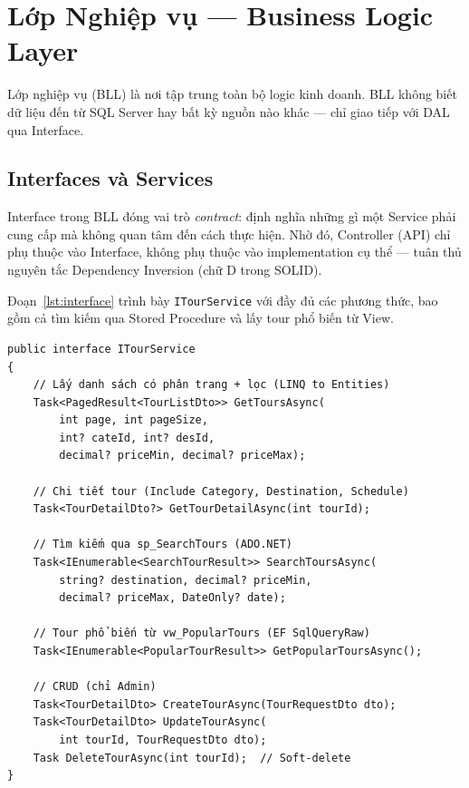 \section{Lớp Nghiệp vụ — Business Logic Layer}\label{Sec3.3}

Lớp nghiệp vụ (BLL) là nơi tập trung toàn bộ logic kinh doanh.
BLL không biết dữ liệu đến từ SQL Server hay bất kỳ nguồn nào
khác — chỉ giao tiếp với DAL qua Interface.

\subsection{Interfaces và Services}\label{sub3.3.1}

\begin{de}\label{def3.4}
Interface trong BLL đóng vai trò \textit{contract}: định nghĩa
những gì một Service phải cung cấp mà không quan tâm đến cách
thực hiện. Nhờ đó, Controller (API) chỉ phụ thuộc vào Interface,
không phụ thuộc vào implementation cụ thể — tuân thủ nguyên tắc
Dependency Inversion (chữ D trong SOLID).
\end{de}

Đoạn~\ref{lst:interface} trình bày \texttt{ITourService} với
đầy đủ các phương thức, bao gồm cả tìm kiếm qua Stored
Procedure và lấy tour phổ biến từ View.

\begin{lstlisting}[style=csharp,
  caption={ITourService -- Interface của BLL},
  label={lst:interface}]
public interface ITourService
{
    // Lấy danh sách có phân trang + lọc (LINQ to Entities)
    Task<PagedResult<TourListDto>> GetToursAsync(
        int page, int pageSize,
        int? cateId, int? desId,
        decimal? priceMin, decimal? priceMax);

    // Chi tiết tour (Include Category, Destination, Schedule)
    Task<TourDetailDto?> GetTourDetailAsync(int tourId);

    // Tìm kiếm qua sp_SearchTours (ADO.NET)
    Task<IEnumerable<SearchTourResult>> SearchToursAsync(
        string? destination, decimal? priceMin,
        decimal? priceMax, DateOnly? date);

    // Tour phổ biến từ vw_PopularTours (EF SqlQueryRaw)
    Task<IEnumerable<PopularTourResult>> GetPopularToursAsync();

    // CRUD (chỉ Admin)
    Task<TourDetailDto> CreateTourAsync(TourRequestDto dto);
    Task<TourDetailDto> UpdateTourAsync(
        int tourId, TourRequestDto dto);
    Task DeleteTourAsync(int tourId);  // Soft-delete
}
\end{lstlisting}

